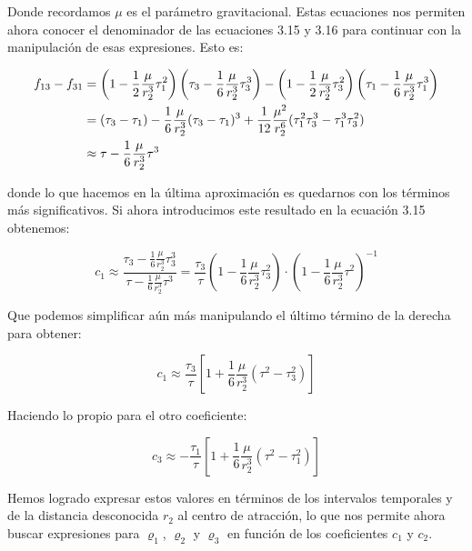 \documentclass{article}
\numberwithin{equation}{section}
\begin{document}
Donde recordamos $\mu$ es el parámetro gravitacional. Estas ecuaciones nos permiten ahora conocer el denominador de las ecuaciones 3.15 y 3.16 para continuar con la manipulación de esas expresiones. Esto es:

\begin{align}
    f_{13} - f_{31} &= \left( 1 - \frac{1}{2} \frac{\mu}{r_2^3} \tau_1^2 \right) 
    \left( \tau_3 - \frac{1}{6} \frac{\mu}{r_2^3} \tau_3^3 \right) - \left( 1 - \frac{1}{2} \frac{\mu}{r_2^3} \tau_3^2 \right) 
    \left( \tau_1 - \frac{1}{6} \frac{\mu}{r_2^3} \tau_1^3 \right) \notag\\
    &= (\tau_3 - \tau_1) - \frac{1}{6} \frac{\mu}{r_2^3} (\tau_3 - \tau_1)^3  + \frac{1}{12} \frac{\mu^2}{r_2^6} (\tau_1^2 \tau_3^3 - \tau_1^3 \tau_3^2) \notag\\
    &\approx \tau - \frac{1}{6} \frac{\mu}{r_2^3} \tau^3
\end{align}

donde lo que hacemos en la última aproximación es quedarnos con los términos más significativos. Si ahora introducimos este resultado en la ecuación 3.15 obtenemos:

\begin{equation}
    c_1 \approx \frac{\tau_3 - \frac{1}{6} \frac{\mu}{r_2^3} \tau_3^3}{\tau - \frac{1}{6} \frac{\mu}{r_2^3} \tau^3} 
    = \frac{\tau_3}{\tau} \left( 1 - \frac{1}{6} \frac{\mu}{r_2^3} \tau_3^2 \right) \cdot \left( 1 - \frac{1}{6} \frac{\mu}{r_2^3} \tau^2 \right)^{-1}
\end{equation}

Que podemos simplificar aún más manipulando el último término de la derecha para obtener:

\begin{equation}
c_1 \approx \frac{\tau_3}{\tau} \left[ 1 + \frac{1}{6} \frac{\mu}{r_2^3} (\tau^2 - \tau_3^2) \right]
\end{equation}

Haciendo lo propio para el otro coeficiente:

\begin{equation}
c_3 \approx -\frac{\tau_1}{\tau} \left[ 1 + \frac{1}{6} \frac{\mu}{r_2^3} (\tau^2 - \tau_1^2) \right]
\end{equation}

Hemos logrado expresar estos valores en términos de los intervalos temporales y de la distancia desconocida $r_2$ al centro de atracción, lo que nos permite ahora buscar expresiones para $\varrho_1$, $\varrho_2$ y $\varrho_3$ en función de los coeficientes $c_1$ y $c_2$.\\
\end{document}
